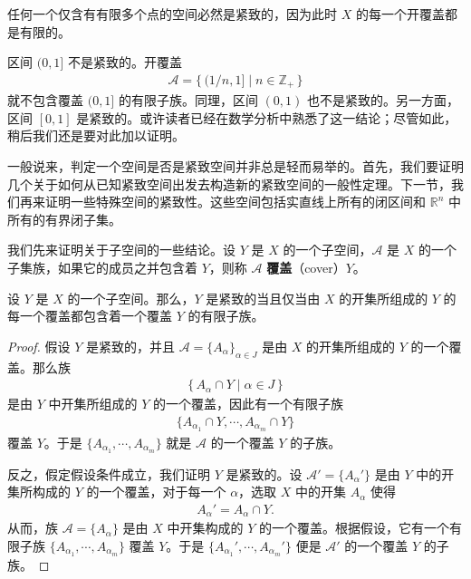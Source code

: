 \begin{example}\label{example:ch03-finite-space-compact}
任何一个仅含有有限多个点的空间必然是紧致的，因为此时 $X$ 的每一个开覆盖都是有限的。
\end{example}

\begin{example}\label{example:ch03-half-open-not-compact}
区间 $(0,1]$ 不是紧致的。开覆盖
\begin{align*}
\mathcal{A}=\{\,(1/n,1]\mid n\in\mathbb{Z}_{+}\,\}
\end{align*}
就不包含覆盖 $(0,1]$ 的有限子族。同理，区间 $(0,1)$ 也不是紧致的。另一方面，区间 $[0,1]$ 是紧致的。或许读者已经在数学分析中熟悉了这一结论；尽管如此，稍后我们还是要对此加以证明。
\end{example}

一般说来，判定一个空间是否是紧致空间并非总是轻而易举的。首先，我们要证明几个关于如何从已知紧致空间出发去构造新的紧致空间的一般性定理。下一节，我们再来证明一些特殊空间的紧致性。这些空间包括实直线上所有的闭区间和 $\mathbb{R}^{n}$ 中所有的有界闭子集。

我们先来证明关于子空间的一些结论。设 $Y$ 是 $X$ 的一个子空间，$\mathcal{A}$ 是 $X$ 的一个子集族，如果它的成员之并包含着 $Y$，则称 $\mathcal{A}$ \textbf{覆盖}（cover）$Y$。

\begin{lemma}\label{lemma:ch03-compact-subspace-cover}
设 $Y$ 是 $X$ 的一个子空间。那么，$Y$ 是紧致的当且仅当由 $X$ 的开集所组成的 $Y$ 的每一个覆盖都包含着一个覆盖 $Y$ 的有限子族。
\end{lemma}

\begin{proof}
假设 $Y$ 是紧致的，并且 $\mathcal{A}=\{A_{\alpha}\}_{\alpha\in J}$ 是由 $X$ 的开集所组成的 $Y$ 的一个覆盖。那么族
\begin{align*}
\{\,A_{\alpha}\cap Y\mid\alpha\in J\,\}
\end{align*}
是由 $Y$ 中开集所组成的 $Y$ 的一个覆盖，因此有一个有限子族
\begin{align*}
\{A_{\alpha_{1}}\cap Y,\cdots,A_{\alpha_{m}}\cap Y\}
\end{align*}
覆盖 $Y$。于是 $\{A_{\alpha_{1}},\cdots,A_{\alpha_{m}}\}$ 就是 $\mathcal{A}$ 的一个覆盖 $Y$ 的子族。

反之，假定假设条件成立，我们证明 $Y$ 是紧致的。设 $\mathcal{A}'=\{A_{\alpha}'\}$ 是由 $Y$ 中的开集所构成的 $Y$ 的一个覆盖，对于每一个 $\alpha$，选取 $X$ 中的开集 $A_{\alpha}$ 使得
\begin{align*}
A_{\alpha}'=A_{\alpha}\cap Y.
\end{align*}
从而，族 $\mathcal{A}=\{A_{\alpha}\}$ 是由 $X$ 中开集构成的 $Y$ 的一个覆盖。根据假设，它有一个有限子族 $\{A_{\alpha_{1}},\cdots,A_{\alpha_{m}}\}$ 覆盖 $Y$。于是 $\{A_{\alpha_{1}}',\cdots,A_{\alpha_{m}}'\}$ 便是 $\mathcal{A}'$ 的一个覆盖 $Y$ 的子族。
\end{proof}

